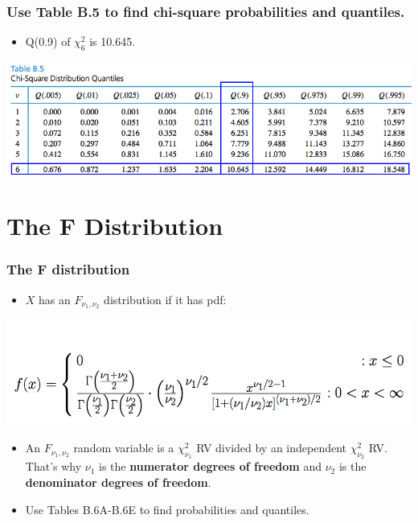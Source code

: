 \documentclass[handout]{beamer}\usepackage[]{graphicx}\usepackage[]{color}
\numberwithin{equation}{section}
\begin{document}
\begin{frame}
\frametitle{Use Table B.5 to find chi-square probabilities and quantiles.}
\begin{itemize}
\item Q(0.9) of $\chi^2_6$ is 10.645.
\end{itemize}
 \includegraphics{../../fig/chisquaretab.png}
\end{frame}


\section{The F Distribution}

\begin{frame}
\frametitle{The F distribution}
\begin{itemize}
\item $X$ has an $F_{\nu_1, \nu_2}$ distribution if it has pdf:
\end{itemize}
\begin{center}
 \includegraphics{../../fig/fpdf.png}
\end{center}
\begin{itemize}
\pause \item An $F_{\nu_1, \nu_2}$ random variable is a $\chi^2_{\nu_1}$ RV divided by an independent $\chi^2_{\nu_2}$ RV. That's why $\nu_1$ is the {\bf numerator degrees of freedom} and $\nu_2$ is the {\bf denominator degrees of freedom}. 
\pause \item Use Tables B.6A-B.6E to find probabilities and quantiles.
\end{itemize}
\end{frame}
\end{document}
